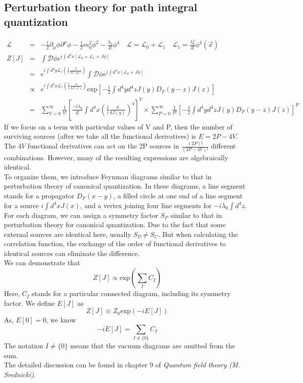 \documentclass{article}
\begin{document}
\subsection{Perturbation theory for path integral quantization}
\begin{eqnarray}
\mathcal{L} &=& -\frac{1}{2}\partial_{\mu} \phi \partial^{\mu} \phi -\frac{1}{2}m_0^2 \phi^2 -\frac{\lambda_0}{4!}\phi^4 \quad \mathcal{L} = \mathcal{L}_0 + \mathcal{L}_1 \quad \mathcal{L}_1 = \frac{\lambda_0^4}{4!} \phi^4 (\vec{x}) \nonumber \\
Z[J] &=& \int \mathcal{D}\phi e^{i\int d^4x [\mathcal{L}_0 + \mathcal{L}_1 + J\phi]} \nonumber \\
&=& e^{i\int d^4y \mathcal{L}_1(\frac{1}{i} \frac{\delta}{\delta J(y)})} \int \mathcal{D}\phi e^{i\int d^4x [\mathcal{L}_0 + J\phi]} \nonumber \\
&\propto & e^{i\int d^4x \mathcal{L}_1(\frac{1}{i} \frac{\delta}{\delta J(x)})} \mathrm{exp} [-\frac{1}{2} \int d^4y d^4z J(y)D_F(y-z)J(z)] \nonumber \\
& =& \sum_{V=0}^{\infty} \frac{1}{V!} [ \frac{-i\lambda_0}{4!} \int d^4x (\frac{1}{i} \frac{\delta}{\delta J(y)})^4]^V \times \sum_{P=0}^{\infty} \frac{1}{P!} [-\frac{1}{2} \int d^4y d^4z J(y)D_F(y-z)J(z)]^P
\end{eqnarray}
If we focus on a term with particular values of V and P, then
the number of surviving sources (after we take all the functional derivatives) is $E = 2P-4V$. The $4V$ functional derivatives can act on the 2P sources in $\frac{(2P)!}{(2P-4V)!}$ different combinations. However, many of the resulting expressions are algebraically identical.\\
To organize them, we introduce Feynman diagrams similar to that in perturbation theory of canonical quantization. In these diagrams, a line segment stands for a propagator $D_F(x-y)$, a filled circle at one end of a line segment for a source $i\int d^4x J(x)$, and a vertex joining four line segments for $-i\lambda_0 \int d^4 z$.\\
For each diagram, we can assign a symmetry factor $S_P$ similar to that in perturbation theory for canonical quantization. Due to the fact that some external sources are identical here, usually $S_P \neq S_C$. But when calculating the correlation function, the exchange of the order of functional derivatives to identical sources can eliminate the difference.\\
We can demonstrate that
\[Z[J] \propto \mathrm{exp}(\sum_I C_I)\]
Here, $C_I$ stands for a particular connected diagram, including its symmetry factor. We define $E[J]$ as
\[Z[J] \equiv Z_0 \mathrm{exp}(-iE[J])\]
As, $E[0]=0$, we know
\[-iE[J] = \sum_{I \neq \{0\}} C_I\]
The notation $I\neq \{0\}$ means that the vacuum diagrams are omitted from the sum.\\
The detailed discussion can be found in chapter 9 of \emph{Quantum field theory (M. Srednicki)}.
\end{document}
